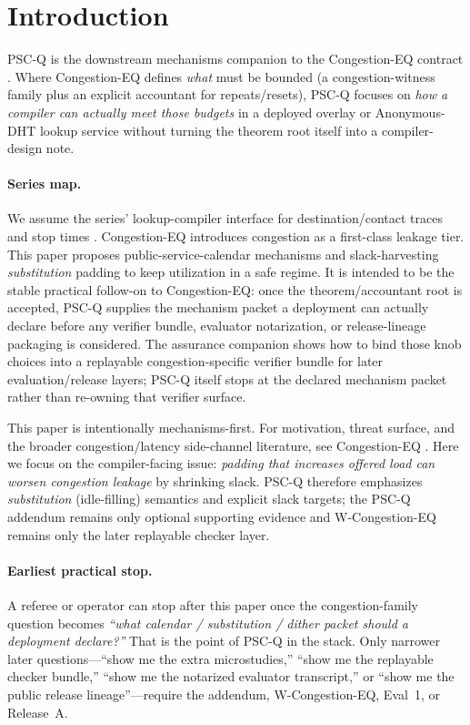 \documentclass[11pt]{article}
\theoremstyle{definition}
\theoremstyle{remark}
\begin{document}
\section{Introduction}
PSC-Q is the downstream mechanisms companion to the Congestion-EQ contract \cite{series:congeq}.
Where Congestion-EQ defines \emph{what} must be bounded (a congestion-witness family plus an explicit accountant for repeats/resets), PSC-Q focuses on \emph{how a compiler can actually meet those budgets} in a deployed overlay or Anonymous-DHT lookup service without turning the theorem root itself into a compiler-design note.

\paragraph{Series map.}
We assume the series' lookup-compiler interface for destination/contact traces and stop times \cite{series:schedcompiler,series:knapsacktransport}.
Congestion-EQ \cite{series:congeq} introduces congestion as a first-class leakage tier.
This paper proposes public-service-calendar mechanisms and slack-harvesting \emph{substitution} padding to keep utilization in a safe regime.
It is intended to be the stable practical follow-on to Congestion-EQ: once the theorem/accountant root is accepted, PSC-Q supplies the mechanism packet a deployment can actually declare before any verifier bundle, evaluator notarization, or release-lineage packaging is considered. The assurance companion \cite{series:wcongeq} shows how to bind those knob choices into a replayable congestion-specific verifier bundle for later evaluation/release layers; PSC-Q itself stops at the declared mechanism packet rather than re-owning that verifier surface.

This paper is intentionally mechanisms-first.
For motivation, threat surface, and the broader congestion/latency side-channel literature, see Congestion-EQ \cite{series:congeq}.
Here we focus on the compiler-facing issue: \emph{padding that increases offered load can worsen congestion leakage} by shrinking slack.
PSC-Q therefore emphasizes \emph{substitution} (idle-filling) semantics and explicit slack targets; the PSC-Q addendum remains only optional supporting evidence and W-Congestion-EQ remains only the later replayable checker layer.\cite{series:pscqaddendum,series:wcongeq}

\paragraph{Earliest practical stop.}
A referee or operator can stop after this paper once the congestion-family question becomes \emph{``what calendar / substitution / dither packet should a deployment declare?''}
That is the point of PSC-Q in the stack.
Only narrower later questions---``show me the extra microstudies,'' ``show me the replayable checker bundle,'' ``show me the notarized evaluator transcript,'' or ``show me the public release lineage''---require the addendum, W-Congestion-EQ, Eval~1, or Release~A.\cite{series:pscqaddendum,series:wcongeq,series:evalnotary,anondht_release_receipts}
\end{document}
